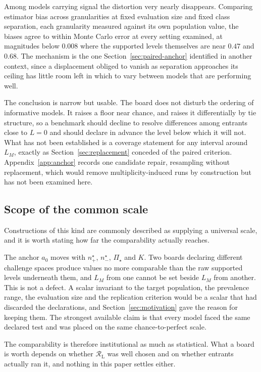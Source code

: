 \documentclass[11pt]{article}
\newcommand{\Regime}{\mathcal{R}}
\newcommand{\PSet}{\Pi_\star}
\newcommand{\RegimeL}{\Regime_{\mathrm{L}}}
\theoremstyle{remark}
\begin{document}
Among models carrying signal the distortion very nearly disappears. Comparing estimator bias across granularities at fixed evaluation size and fixed class separation, each granularity measured against its own population value, the biases agree to within Monte Carlo error at every setting examined, at magnitudes below $0.008$ where the supported levels themselves are near $0.47$ and $0.68$. The mechanism is the one Section~\ref{sec:paired-anchor} identified in another context, since a displacement obliged to vanish as separation approaches its ceiling has little room left in which to vary between models that are performing well.

The conclusion is narrow but usable. The board does not disturb the ordering of informative models. It raises a floor near chance, and raises it differentially by tie structure, so a benchmark should decline to resolve differences among entrants close to $L=0$ and should declare in advance the level below which it will not. What has not been established is a coverage statement for any interval around $L_M$, exactly as Section~\ref{sec:replacement} conceded of the paired criterion. Appendix~\ref{app:anchor} records one candidate repair, resampling without replacement, which would remove multiplicity-induced runs by construction but has not been examined here.

\subsection{Scope of the common scale}
\label{sec:what-universal-means}

Constructions of this kind are commonly described as supplying a universal scale, and it is worth stating how far the comparability actually reaches.

The anchor $a_0$ moves with $n^\star_+$, $n^\star_-$, $\PSet$ and $K$. Two boards declaring different challenge spaces produce values no more comparable than the raw supported levels underneath them, and $L_M$ from one cannot be set beside $L_M$ from another. This is not a defect. A scalar invariant to the target population, the prevalence range, the evaluation size and the replication criterion would be a scalar that had discarded the declarations, and Section~\ref{sec:motivation} gave the reason for keeping them. The strongest available claim is that every model faced the same declared test and was placed on the same chance-to-perfect scale.

The comparability is therefore institutional as much as statistical. What a board is worth depends on whether $\RegimeL$ was well chosen and on whether entrants actually ran it, and nothing in this paper settles either.
\end{document}
